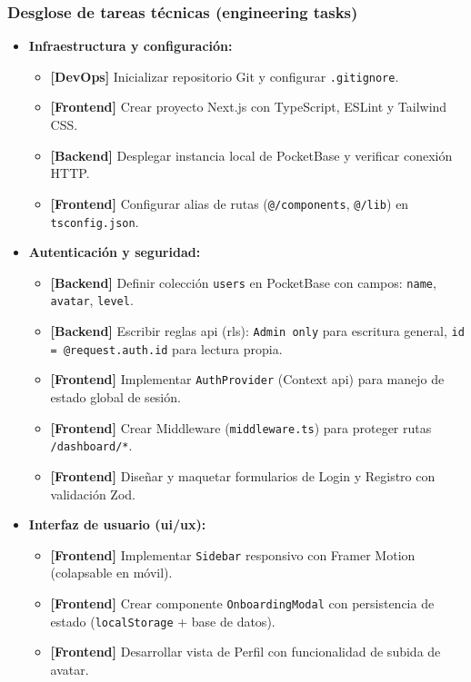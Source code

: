 \subsubsection{Desglose de tareas técnicas (engineering tasks)}

\begin{itemize}
\item \textbf{Infraestructura y configuración:}
\begin{itemize}
\item \textbf{[DevOps]} Inicializar repositorio Git y configurar \texttt{.gitignore}.
\item \textbf{[Frontend]} Crear proyecto Next.js con TypeScript, ESLint y Tailwind CSS.
\item \textbf{[Backend]} Desplegar instancia local de PocketBase y verificar conexión HTTP.
\item \textbf{[Frontend]} Configurar alias de rutas (\texttt{@/components}, \texttt{@/lib}) en \texttt{tsconfig.json}.
\end{itemize}
\end{itemize}

\begin{itemize}
\item \textbf{Autenticación y seguridad:}
\begin{itemize}
\item \textbf{[Backend]} Definir colección \texttt{users} en PocketBase con campos: \texttt{name}, \texttt{avatar}, \texttt{level}.
\item \textbf{[Backend]} Escribir reglas \gls{api} (\gls{rls}): \texttt{Admin only} para escritura general, \texttt{id = @request.auth.id} para lectura propia.
\item \textbf{[Frontend]} Implementar \texttt{AuthProvider} (Context \gls{api}) para manejo de estado global de sesión.
\item \textbf{[Frontend]} Crear Middleware (\texttt{middleware.ts}) para proteger rutas \texttt{/dashboard/*}.
\item \textbf{[Frontend]} Diseñar y maquetar formularios de Login y Registro con validación Zod.
\end{itemize}
\end{itemize}

\begin{itemize}
\item \textbf{Interfaz de usuario (\gls{ui}/\gls{ux}):}
\begin{itemize}
\item \textbf{[Frontend]} Implementar \texttt{Sidebar} responsivo con Framer Motion (colapsable en móvil).
\item \textbf{[Frontend]} Crear componente \texttt{OnboardingModal} con persistencia de estado (\texttt{localStorage} + base de datos).
\item \textbf{[Frontend]} Desarrollar vista de Perfil con funcionalidad de subida de avatar.
\end{itemize}
\end{itemize}

